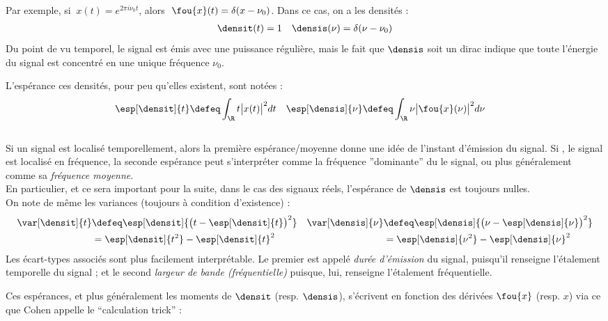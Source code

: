 Par exemple, si $\ x(t)=e^{2\pi i\nu_0 t}$, alors $\ \fou{x}(t) = \delta(x-\nu_0)$. Dans ce cas, on a les densités :
\begin{align*}
	\densit(t) &= 1  &  \densis(\nu) = \delta(\nu-\nu_0)
\end{align*}
Du point de vu temporel, le signal est émis avec une puissance régulière, mais le fait que $\densis$ soit un dirac indique que toute l'énergie du signal est concentré en une unique fréquence $\nu_0$.


\begin{definition}\label{def:band-width}
	L'espérance ces densités, pour peu qu'elles existent, sont notées :
	\begin{align*}
		\esp[\densit]{t} &\defeq \int_\R t \big|x(t)\big|^2 dt   &  \esp[\densis]{\nu} &\defeq \int_\R \nu \big|\fou{x}(\nu)\big|^2 d\nu
	\end{align*}
	\\
	Si un signal est localisé temporellement, alors la première espérance/moyenne donne une idée de l'instant d'émission du signal. Si \acontrario, le signal est localisé en fréquence, la seconde espérance peut s'interpréter comme la fréquence ''dominante'' du le signal, ou plus généralement comme sa \emph{fréquence moyenne}. \\
	En particulier, et ce sera important pour la suite, dans le cas des signaux réels, l'espérance de $\densis$ est toujours nulles.
	\\
	On note de même les variances (toujours à condition d'existence) :
	\begin{align*}
		\var[\densit]{t} &\defeq \esp[\densit]{\big(t-\esp[\densit]{t}\big)^2}  &  \var[\densis]{\nu} &\defeq \esp[\densis]{\big(\nu - \esp[\densis]{\nu}\big)^2}\\
		& = \esp[\densit]{t^2} - \esp[\densit]{t}^2  &  &= \esp[\densis]{\nu^2} - \esp[\densis]{\nu}^2
	\end{align*}
	Les écart-types associés sont plus facilement interprétable. Le premier est appelé \emph{durée d'émission} du signal, puisqu'il renseigne l'étalement temporelle du signal ; et le second \emph{largeur de bande (fréquentielle)} puisque, lui, renseigne l'étalement fréquentielle. 
\end{definition}

Ces espérances, et plus généralement les moments de $\densit$ (resp. $\densis$), s'écrivent en fonction des dérivées $\fou{x}$ (resp. $x$) via ce que Cohen appelle le ``calculation trick'' \cite{cohen_time_1995} :

